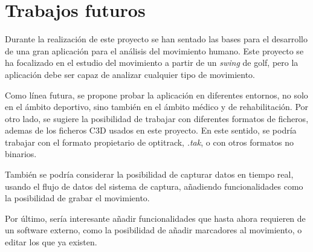 \section{Trabajos futuros}

Durante la realización de este proyecto se han sentado las bases para el desarrollo de una gran aplicación para el análisis del movimiento humano. Este proyecto se ha focalizado en el estudio del movimiento a partir de un \textit{swing} de golf, pero la aplicación debe ser capaz de analizar cualquier tipo de movimiento. 

Como línea futura, se propone probar la aplicación en diferentes entornos, no solo en el ámbito deportivo, sino también en el ámbito médico y de rehabilitación. Por otro lado, se sugiere la posibilidad de trabajar con diferentes formatos de ficheros, ademas de los ficheros \ac{C3D} usados en este proyecto. En este sentido, se podría trabajar con el formato propietario de optitrack, \textit{.tak}, o con otros formatos no binarios.

También se podría considerar la posibilidad de capturar datos en tiempo real, usando el flujo de datos del sistema de captura, añadiendo funcionalidades como la posibilidad de grabar el movimiento.

Por último, sería interesante añadir funcionalidades que hasta ahora requieren de un software externo, como la posibilidad de añadir marcadores al movimiento, o editar los que ya existen.
